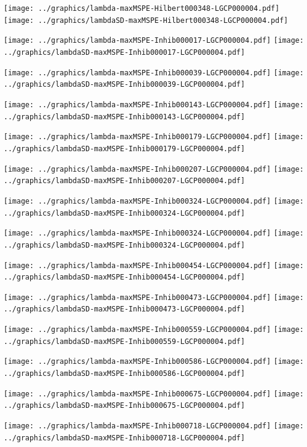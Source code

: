 \documentclass[review]{elsarticle}
\begin{document}
\texttt{[image: ../graphics/lambda-maxMSPE-Hilbert000348-LGCP000004.pdf]}
\texttt{[image: ../graphics/lambdaSD-maxMSPE-Hilbert000348-LGCP000004.pdf]}

\texttt{[image: ../graphics/lambda-maxMSPE-Inhib000017-LGCP000004.pdf]}
\texttt{[image: ../graphics/lambdaSD-maxMSPE-Inhib000017-LGCP000004.pdf]}

\texttt{[image: ../graphics/lambda-maxMSPE-Inhib000039-LGCP000004.pdf]}
\texttt{[image: ../graphics/lambdaSD-maxMSPE-Inhib000039-LGCP000004.pdf]}

\texttt{[image: ../graphics/lambda-maxMSPE-Inhib000143-LGCP000004.pdf]}
\texttt{[image: ../graphics/lambdaSD-maxMSPE-Inhib000143-LGCP000004.pdf]}

\texttt{[image: ../graphics/lambda-maxMSPE-Inhib000179-LGCP000004.pdf]}
\texttt{[image: ../graphics/lambdaSD-maxMSPE-Inhib000179-LGCP000004.pdf]}

\texttt{[image: ../graphics/lambda-maxMSPE-Inhib000207-LGCP000004.pdf]}
\texttt{[image: ../graphics/lambdaSD-maxMSPE-Inhib000207-LGCP000004.pdf]}

\texttt{[image: ../graphics/lambda-maxMSPE-Inhib000324-LGCP000004.pdf]}
\texttt{[image: ../graphics/lambdaSD-maxMSPE-Inhib000324-LGCP000004.pdf]}

\texttt{[image: ../graphics/lambda-maxMSPE-Inhib000324-LGCP000004.pdf]}
\texttt{[image: ../graphics/lambdaSD-maxMSPE-Inhib000324-LGCP000004.pdf]}

\texttt{[image: ../graphics/lambda-maxMSPE-Inhib000454-LGCP000004.pdf]}
\texttt{[image: ../graphics/lambdaSD-maxMSPE-Inhib000454-LGCP000004.pdf]}

\texttt{[image: ../graphics/lambda-maxMSPE-Inhib000473-LGCP000004.pdf]}
\texttt{[image: ../graphics/lambdaSD-maxMSPE-Inhib000473-LGCP000004.pdf]}

\texttt{[image: ../graphics/lambda-maxMSPE-Inhib000559-LGCP000004.pdf]}
\texttt{[image: ../graphics/lambdaSD-maxMSPE-Inhib000559-LGCP000004.pdf]}

\texttt{[image: ../graphics/lambda-maxMSPE-Inhib000586-LGCP000004.pdf]}
\texttt{[image: ../graphics/lambdaSD-maxMSPE-Inhib000586-LGCP000004.pdf]}

\texttt{[image: ../graphics/lambda-maxMSPE-Inhib000675-LGCP000004.pdf]}
\texttt{[image: ../graphics/lambdaSD-maxMSPE-Inhib000675-LGCP000004.pdf]}

\texttt{[image: ../graphics/lambda-maxMSPE-Inhib000718-LGCP000004.pdf]}
\texttt{[image: ../graphics/lambdaSD-maxMSPE-Inhib000718-LGCP000004.pdf]}
\end{document}
